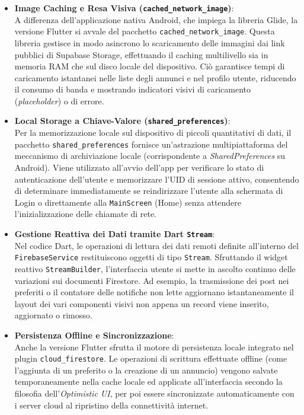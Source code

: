 \documentclass[a4paper]{report}
\begin{document}
\begin{itemize}
    \item \textbf{Image Caching e Resa Visiva (\texttt{cached\_network\_image})}: \\
    A differenza dell'applicazione nativa Android, che impiega la libreria Glide, la versione Flutter si avvale del pacchetto \texttt{cached\_network\_image}. Questa libreria gestisce in modo asincrono lo scaricamento delle immagini dai link pubblici di Supabase Storage, effettuando il caching multilivello sia in memoria RAM che sul disco locale del dispositivo. Ciò garantisce tempi di caricamento istantanei nelle liste degli annunci e nel profilo utente, riducendo il consumo di banda e mostrando indicatori visivi di caricamento (\textit{placeholder}) o di errore.

    \item \textbf{Local Storage a Chiave-Valore (\texttt{shared\_preferences})}: \\
    Per la memorizzazione locale sul dispositivo di piccoli quantitativi di dati, il pacchetto \texttt{shared\_preferences} fornisce un'astrazione multipiattaforma del meccanismo di archiviazione locale (corrispondente a \textit{SharedPreferences} su Android). Viene utilizzato all'avvio dell'app per verificare lo stato di autenticazione dell'utente e memorizzare l'UID di sessione attivo, consentendo di determinare immediatamente se reindirizzare l'utente alla schermata di Login o direttamente alla \texttt{MainScreen} (Home) senza attendere l'inizializzazione delle chiamate di rete.

    \item \textbf{Gestione Reattiva dei Dati tramite Dart \texttt{Stream}}: \\
    Nel codice Dart, le operazioni di lettura dei dati remoti definite all'interno del \texttt{FirebaseService} restituiscono oggetti di tipo \texttt{Stream}. Sfruttando il widget reattivo \texttt{StreamBuilder}, l'interfaccia utente si mette in ascolto continuo delle variazioni sui documenti Firestore. Ad esempio, la trasmissione dei post nei preferiti o il contatore delle notifiche non lette aggiornano istantaneamente il layout dei vari componenti visivi non appena un record viene inserito, aggiornato o rimosso.

    \item \textbf{Persistenza Offline e Sincronizzazione}: \\
    Anche la versione Flutter sfrutta il motore di persistenza locale integrato nel plugin \texttt{cloud\_firestore}. Le operazioni di scrittura effettuate offline (come l'aggiunta di un preferito o la creazione di un annuncio) vengono salvate temporaneamente nella cache locale ed applicate all'interfaccia secondo la filosofia dell'\textit{Optimistic UI}, per poi essere sincronizzate automaticamente con i server cloud al ripristino della connettività internet.
\end{itemize}
\end{document}
